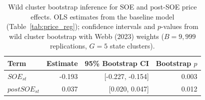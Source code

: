 \begin{table}[!h]
\centering
\caption{\label{tab:tab:price_wcb}Wild cluster bootstrap inference for SOE and post-SOE price effects. OLS estimates from the baseline model (Table~\ref{tab:price_reg}); confidence intervals and $p$-values from wild cluster bootstrap with Webb (2023) weights ($B = 9{,}999$ replications, $G = 5$ state clusters).}
\centering
\begin{tabular}[t]{lrrr}
\toprule
Term & Estimate & 95\% Bootstrap CI & Bootstrap $p$\\
\midrule
$SOE_{st}$ & -0.193 & {}[-0.227, -0.154] & 0.003\\
$postSOE_{st}$ & 0.037 & {}[0.020, 0.047] & 0.012\\
\bottomrule
\end{tabular}
\end{table}
